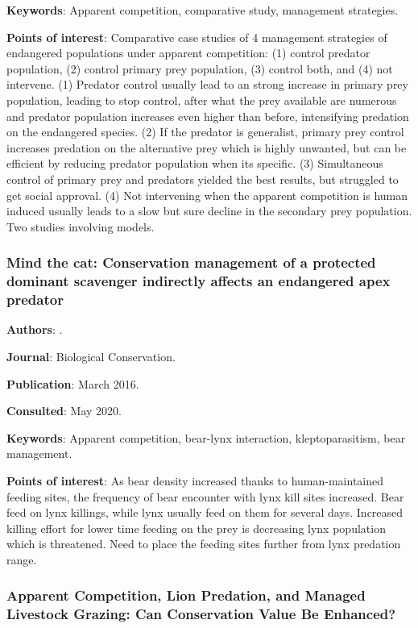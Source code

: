 \documentclass[12pt,a4paper]{article}
\begin{document}
\textbf{Keywords}: Apparent competition, comparative study, management strategies.

\textbf{Points of interest}: Comparative case studies of 4 management strategies of endangered populations under apparent competition: (1) control predator population, (2) control primary prey population, (3) control both, and (4) not intervene.
(1) Predator control usually lead to an strong increase in primary prey population, leading to stop control, after what the prey available are numerous and predator population increases even higher than before, intensifying predation on the endangered species.
(2) If the predator is generalist, primary prey control increases predation on the alternative prey which is highly unwanted, but can be efficient by reducing predator population when its specific.
(3) Simultaneous control of primary prey and predators yielded the best results, but struggled to get social approval.
(4) Not intervening when the apparent competition is human induced usually leads to a slow but sure decline in the secondary prey population.
Two studies involving models.
\newpage

\subsubsection*{Mind the cat: Conservation management of a protected dominant scavenger indirectly affects an endangered apex predator}

\textbf{Authors}: \cite{KROFEL201640}.

\textbf{Journal}: Biological Conservation.

\textbf{Publication}: March 2016.

\textbf{Consulted}: May 2020.

\textbf{Keywords}: Apparent competition, bear-lynx interaction, kleptoparasitism, bear management.

\textbf{Points of interest}: As bear density increased thanks to human-maintained feeding sites, the frequency of bear encounter with lynx kill sites increased. Bear feed on lynx killings, while lynx usually feed on them for several days. Increased killing effort for lower time feeding on the prey is decreasing lynx population which is threatened. Need to place the feeding sites further from lynx predation range.

\newpage

\subsubsection*{Apparent Competition, Lion Predation, and Managed Livestock Grazing: Can Conservation Value Be Enhanced?}
\end{document}
